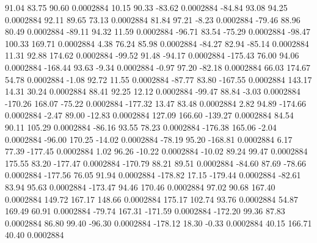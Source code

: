        91.04       83.75       90.60     0.0002884
       10.15       90.33      -83.62     0.0002884
      -84.84       93.08       94.25     0.0002884
       92.11       89.65       73.13     0.0002884
       81.84       97.21       -8.23     0.0002884
      -79.46       88.96       80.49     0.0002884
      -89.11       94.32       11.59     0.0002884
      -96.71       83.54      -75.29     0.0002884
      -98.47      100.33      169.71     0.0002884
        4.38       76.24       85.98     0.0002884
      -84.27       82.94      -85.14     0.0002884
       11.31       92.88      174.62     0.0002884
      -99.52       91.48      -94.17     0.0002884
     -175.43       76.00       94.06     0.0002884
     -168.44       93.63       -9.34     0.0002884
       -0.97       97.20      -82.18     0.0002884
       66.03      174.67       54.78     0.0002884
       -1.08       92.72       11.55     0.0002884
      -87.77       83.80     -167.55     0.0002884
      143.17       14.31       30.24     0.0002884
       88.41       92.25       12.12     0.0002884
      -99.47       88.84       -3.03     0.0002884
     -170.26      168.07      -75.22     0.0002884
     -177.32       13.47       83.48     0.0002884
        2.82       94.89     -174.66     0.0002884
       -2.47       89.00      -12.83     0.0002884
      127.09      166.60     -139.27     0.0002884
       84.54       90.11      105.29     0.0002884
      -86.16       93.55       78.23     0.0002884
     -176.38      165.06       -2.04     0.0002884
      -96.00      170.25      -14.02     0.0002884
      -78.19       95.20     -168.81     0.0002884
        6.17       77.39     -177.45     0.0002884
        1.02       96.26      -10.22     0.0002884
      -10.02       89.24       99.47     0.0002884
      175.55       83.20     -177.47     0.0002884
     -170.79       88.21       89.51     0.0002884
      -84.60       87.69      -78.66     0.0002884
     -177.56       76.05       91.94     0.0002884
     -178.82       17.15     -179.44     0.0002884
      -82.61       83.94       95.63     0.0002884
     -173.47       94.46      170.46     0.0002884
       97.02       90.68      167.40     0.0002884
      149.72      167.17      148.66     0.0002884
      175.17      102.74       93.76     0.0002884
       54.87      169.49       60.91     0.0002884
      -79.74      167.31     -171.59     0.0002884
     -172.20       99.36       87.83     0.0002884
       86.80       99.40      -96.30     0.0002884
     -178.12       18.30       -0.33     0.0002884
       40.15      166.71       40.40     0.0002884
